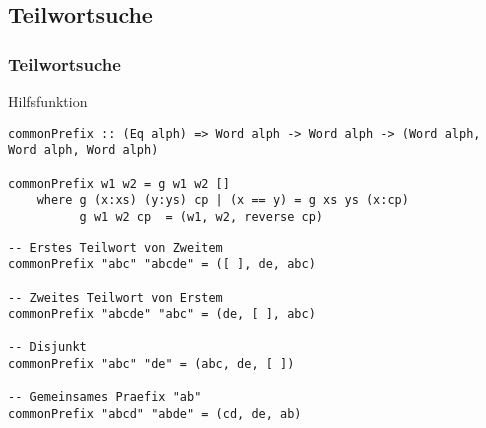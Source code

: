 \documentclass{beamer}
\begin{document}
\subsection{Teilwortsuche}

\begin{frame}[fragile]
\frametitle{Teilwortsuche}
Hilfsfunktion
\begin{lstlisting}
commonPrefix :: (Eq alph) => Word alph -> Word alph -> (Word alph, Word alph, Word alph)

commonPrefix w1 w2 = g w1 w2 []
    where g (x:xs) (y:ys) cp | (x == y) = g xs ys (x:cp)
          g w1 w2 cp  = (w1, w2, reverse cp)
\end{lstlisting}
\begin{examples}
\begin{lstlisting}
-- Erstes Teilwort von Zweitem
commonPrefix "abc" "abcde" = ([ ], de, abc)

-- Zweites Teilwort von Erstem
commonPrefix "abcde" "abc" = (de, [ ], abc)

-- Disjunkt
commonPrefix "abc" "de" = (abc, de, [ ])

-- Gemeinsames Praefix "ab"
commonPrefix "abcd" "abde" = (cd, de, ab)
\end{lstlisting}
\end{examples}
\end{frame}
\end{document}
